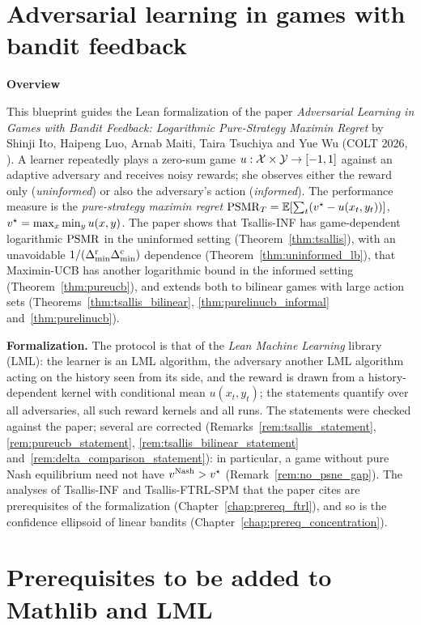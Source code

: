 
\part{Adversarial learning in games with bandit feedback}
\label{part:main}

\textbf{Overview}

This blueprint guides the Lean formalization of the paper \emph{Adversarial Learning in Games with
Bandit Feedback: Logarithmic Pure-Strategy Maximin Regret} by Shinji Ito, Haipeng Luo, Arnab
Maiti, Taira Tsuchiya and Yue Wu (COLT 2026, \cite{ito2026adversarial}). A learner repeatedly plays
a zero-sum game $u : \mathcal{X} \times \mathcal{Y} \to [-1, 1]$ against an adaptive adversary and receives noisy
rewards; she observes either the reward only (\emph{uninformed}) or also the adversary's action
(\emph{informed}). The performance measure is the \emph{pure-strategy maximin regret}
$\mathrm{PSMR}_T = \mathbb{E}[\sum_t (v^\star - u(x_t, y_t))]$, $v^\star = \max_x \min_y u(x, y)$. The paper shows
that Tsallis-INF has game-dependent logarithmic $\mathrm{PSMR}$ in the uninformed setting
(Theorem~\ref{thm:tsallis}), with an unavoidable $1/(\Delta^{\mathrm{r}}_{\min} \Delta^{\mathrm{c}}_{\min})$ dependence
(Theorem~\ref{thm:uninformed_lb}), that Maximin-UCB has another logarithmic bound in the informed
setting (Theorem~\ref{thm:pureucb}), and extends both to bilinear games with large action sets
(Theorems~\ref{thm:tsallis_bilinear}, \ref{thm:purelinucb_informal} and~\ref{thm:purelinucb}).

\textbf{Formalization.} The protocol is that of the \emph{Lean Machine Learning} library (LML):
the learner is an LML algorithm, the adversary another LML algorithm acting on the history seen
from its side, and the reward is drawn from a history-dependent kernel with conditional mean
$u(x_t, y_t)$; the statements quantify over all adversaries, all such reward kernels and all runs.
The statements were checked against the paper; several are corrected
(Remarks~\ref{rem:tsallis_statement}, \ref{rem:pureucb_statement},
\ref{rem:tsallis_bilinear_statement} and~\ref{rem:delta_comparison_statement}): in particular, a
game without pure Nash equilibrium need not have $v^{\mathrm{Nash}} > v^\star$ (Remark~\ref{rem:no_psne_gap}).
The analyses of Tsallis-INF and Tsallis-FTRL-SPM that the paper cites are prerequisites of the
formalization (Chapter~\ref{chap:prereq_ftrl}), and so is the confidence ellipsoid of linear
bandits (Chapter~\ref{chap:prereq_concentration}).








\part{Prerequisites to be added to Mathlib and LML}
\label{part:prereq}





